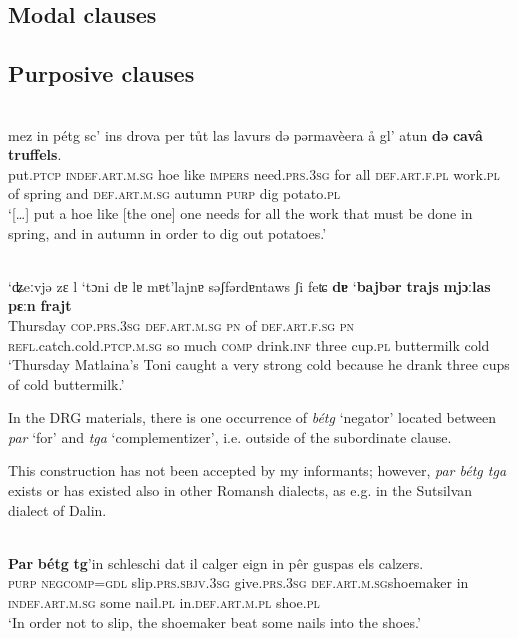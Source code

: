 \subsection{Modal clauses}

\subsection{Purposive clauses}

 \ea\label{ex:1:}
 {\citealt[143]{Büchli1966}}\\
\gll  mez in pétg sc’ ins drova per tůt las lavurs dǝ pǝrmavèera å gl’ atun \textbf{dǝ} \textbf{cavâ} \textbf{truffels}.\\
     put.\textsc{ptcp} \textsc{indef.art.m.sg} hoe like \textsc{impers} need.\textsc{prs.3sg} for all \textsc{def.art.f.pl} work.\textsc{pl} of spring and \textsc{def.art.m.sg} autumn \textsc{purp} dig potato.\textsc{pl}\\
\glt `[…] put a hoe like [the one] one needs for all the work that must be done in spring, and in autumn in order to dig out potatoes.'
\z

\ea\label{}
\\
\gll ‘ʥeːvjǝ zɛ l ‘tɔni dɐ lɐ mɐt’lajnɐ sǝʃfǝrdɐntaws ʃi feʨ \textbf{dɐ} ‘\textbf{bajbǝr} \textbf{trajs} \textbf{mjɔːlas} \textbf{pɛːn} \textbf{frajt}\\
     Thursday \textsc{cop.prs.3sg} \textsc{def.art.m.sg} \textsc{pn} of \textsc{def.art.f.sg} \textsc{pn} \textsc{refl}.catch.cold.\textsc{ptcp.m.sg} so much \textsc{comp} drink.\textsc{inf} three cup.\textsc{pl} buttermilk cold\\
\glt `Thursday Matlaina’s Toni caught a very strong cold because he drank three cups of cold buttermilk.'
\z

In the DRG materials, there is one occurrence of \textit{bétg} `negator' located between \textit{par} `for' and \textit{tga} `complementizer', i.e. outside of the subordinate clause.

This construction has not been accepted by my informants; however, \textit{par bétg tga} exists or has existed also in other Romansh dialects, as e.g. in the Sutsilvan dialect of Dalin.

\ea\label{}
\\
\gll  \textbf{Par} \textbf{bétg} \textbf{tg}'in schleschi dat il calger eign in pêr guspas els calzers.\\
     \textsc{purp} \textsc{neg}\textsc{comp=gdl} slip.\textsc{prs.sbjv.3sg} give.\textsc{prs.3sg} \textsc{def.art.m.sg}shoemaker in \textsc{indef.art.m.sg} some nail.\textsc{pl} in.\textsc{def.art.m.pl} shoe.\textsc{pl}\\
\glt `In order not to slip, the shoemaker beat some nails into the shoes.'
\z


